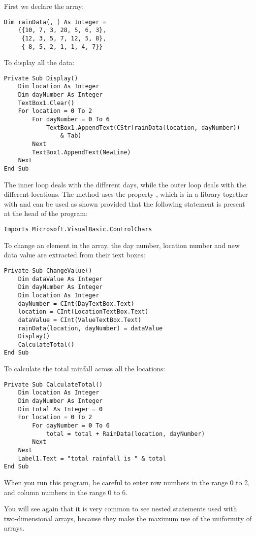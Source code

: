		First we declare the array:
		\begin{lstlisting}
Dim rainData(, ) As Integer =
	{{10, 7, 3, 28, 5, 6, 3},
	 {12, 3, 5, 7, 12, 5, 8},
	 { 8, 5, 2, 1, 1, 4, 7}}
		\end{lstlisting}
		To display all the data:
		\begin{lstlisting}
Private Sub Display()
	Dim location As Integer
	Dim dayNumber As Integer
	TextBox1.Clear()
	For location = 0 To 2
  		For dayNumber = 0 To 6
			TextBox1.AppendText(CStr(rainData(location, dayNumber))
				& Tab)
		Next
		TextBox1.AppendText(NewLine)
	Next
End Sub
		\end{lstlisting}
		The inner  loop deals with the different days, while the outer  loop deals with the different locations. The method uses the property , which is in a library together with  and can be used as shown provided that the following  statement is present at the head of the program:
		\begin{lstlisting}
Imports Microsoft.VisualBasic.ControlChars
		\end{lstlisting}
To change an element in the array, the day number, location number and new data value are extracted from their text boxes:
		\begin{lstlisting}
Private Sub ChangeValue()
	Dim dataValue As Integer
	Dim dayNumber As Integer
	Dim location As Integer
	dayNumber = CInt(DayTextBox.Text)
	location = CInt(LocationTextBox.Text)
	dataValue = CInt(ValueTextBox.Text)
	rainData(location, dayNumber) = dataValue
	Display()
	CalculateTotal()
End Sub
		\end{lstlisting}
		To calculate the total rainfall across all the locations:
		\begin{lstlisting}
Private Sub CalculateTotal()
	Dim location As Integer
	Dim dayNumber As Integer
	Dim total As Integer = 0
	For location = 0 To 2
		For dayNumber = 0 To 6
			total = total + RainData(location, dayNumber)
		Next
	Next
	Label1.Text = "total rainfall is " & total
End Sub
		\end{lstlisting}
		When you run this program, be careful to enter row numbers in the range 0 to 2, and column numbers in the range 0 to 6.
		
		You will see again that it is very common to see nested  statements used with two-dimensional arrays, because they make the maximum use of the uniformity of arrays.


